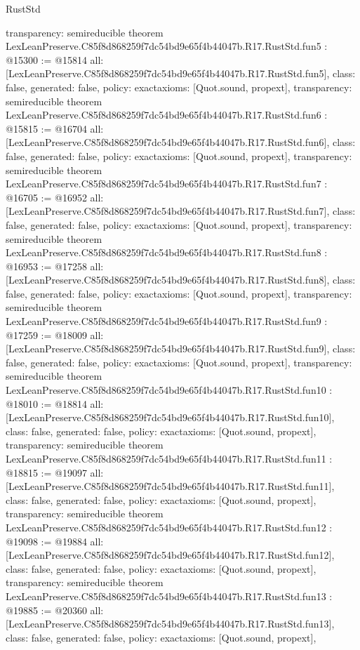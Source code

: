 \begin{lexlean}{RustStd}
\begin{coremodule}
{  transparency: semireducible
}
theorem LexLeanPreserve.C85f8d868259f7dc54bd9e65f4b44047b.R17.RustStd.fun5 : @15300 := @15814 {
  all: [LexLeanPreserve.C85f8d868259f7dc54bd9e65f4b44047b.R17.RustStd.fun5],
  class: false,
  generated: false,
  policy: exact{axioms: [Quot.sound, propext]},
  transparency: semireducible
}
theorem LexLeanPreserve.C85f8d868259f7dc54bd9e65f4b44047b.R17.RustStd.fun6 : @15815 := @16704 {
  all: [LexLeanPreserve.C85f8d868259f7dc54bd9e65f4b44047b.R17.RustStd.fun6],
  class: false,
  generated: false,
  policy: exact{axioms: [Quot.sound, propext]},
  transparency: semireducible
}
theorem LexLeanPreserve.C85f8d868259f7dc54bd9e65f4b44047b.R17.RustStd.fun7 : @16705 := @16952 {
  all: [LexLeanPreserve.C85f8d868259f7dc54bd9e65f4b44047b.R17.RustStd.fun7],
  class: false,
  generated: false,
  policy: exact{axioms: [Quot.sound, propext]},
  transparency: semireducible
}
theorem LexLeanPreserve.C85f8d868259f7dc54bd9e65f4b44047b.R17.RustStd.fun8 : @16953 := @17258 {
  all: [LexLeanPreserve.C85f8d868259f7dc54bd9e65f4b44047b.R17.RustStd.fun8],
  class: false,
  generated: false,
  policy: exact{axioms: [Quot.sound, propext]},
  transparency: semireducible
}
theorem LexLeanPreserve.C85f8d868259f7dc54bd9e65f4b44047b.R17.RustStd.fun9 : @17259 := @18009 {
  all: [LexLeanPreserve.C85f8d868259f7dc54bd9e65f4b44047b.R17.RustStd.fun9],
  class: false,
  generated: false,
  policy: exact{axioms: [Quot.sound, propext]},
  transparency: semireducible
}
theorem LexLeanPreserve.C85f8d868259f7dc54bd9e65f4b44047b.R17.RustStd.fun10 : @18010 := @18814 {
  all: [LexLeanPreserve.C85f8d868259f7dc54bd9e65f4b44047b.R17.RustStd.fun10],
  class: false,
  generated: false,
  policy: exact{axioms: [Quot.sound, propext]},
  transparency: semireducible
}
theorem LexLeanPreserve.C85f8d868259f7dc54bd9e65f4b44047b.R17.RustStd.fun11 : @18815 := @19097 {
  all: [LexLeanPreserve.C85f8d868259f7dc54bd9e65f4b44047b.R17.RustStd.fun11],
  class: false,
  generated: false,
  policy: exact{axioms: [Quot.sound, propext]},
  transparency: semireducible
}
theorem LexLeanPreserve.C85f8d868259f7dc54bd9e65f4b44047b.R17.RustStd.fun12 : @19098 := @19884 {
  all: [LexLeanPreserve.C85f8d868259f7dc54bd9e65f4b44047b.R17.RustStd.fun12],
  class: false,
  generated: false,
  policy: exact{axioms: [Quot.sound, propext]},
  transparency: semireducible
}
theorem LexLeanPreserve.C85f8d868259f7dc54bd9e65f4b44047b.R17.RustStd.fun13 : @19885 := @20360 {
  all: [LexLeanPreserve.C85f8d868259f7dc54bd9e65f4b44047b.R17.RustStd.fun13],
  class: false,
  generated: false,
  policy: exact{axioms: [Quot.sound, propext]},
}
\end{coremodule}
\end{lexlean}
